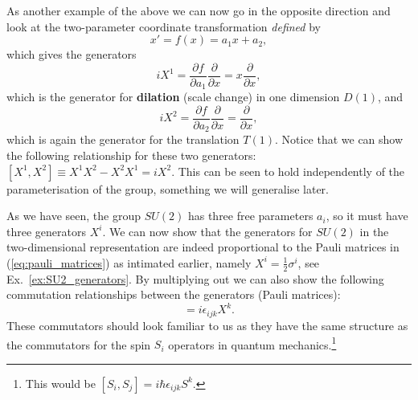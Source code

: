 \documentclass[notes.tex]{subfiles}
\begin{document}
As another example of the above we can now go in the opposite direction and look at the two-parameter coordinate transformation {\it defined} by
\[x' = f(x) = a_1x + a_2,\]
which gives the generators
\[iX^1 = \frac{\partial f}{\partial a_1} \frac{\partial}{\partial x} = x\frac{\partial}{\partial x},\]
which is the generator for {\bf dilation} (scale change) in one dimension $D(1)$, and
\[iX^2 =  \frac{\partial f}{\partial a_2} \frac{\partial}{\partial x} =\frac{\partial}{\partial x},\]
which is again the generator for the translation $T(1)$. 
Notice that we can show the following relationship for these two generators: $[X^1, X^2] \equiv X^1X^2-X^2X^1= iX^2$. This can be seen to hold independently of the parameterisation of the group, something we will generalise later.

As we have seen, the group $SU(2)$ has three free parameters $a_i$, so it must have three generators $X^i$. We can now show that the generators for $SU(2)$ in the two-dimensional representation are indeed proportional to the Pauli matrices in (\ref{eq:pauli_matrices}) as intimated earlier, namely $X^i=\frac{1}{2}\sigma^i$, see Ex.~\ref{ex:SU2_generators}. By multiplying out we can also show the following commutation relationships between the generators (Pauli matrices):
\begin{equation}
[X_i,X_j]=i\epsilon_{ijk}X^k.
\label{eq:su2_algebra}
\end{equation}
These commutators should look familiar to us as they have the same structure as the commutators for the spin $S_i$ operators in quantum mechanics.\footnote{This would be $[S_i,S_j]=i\hbar\epsilon_{ijk}S^k$.} 
\end{document}
